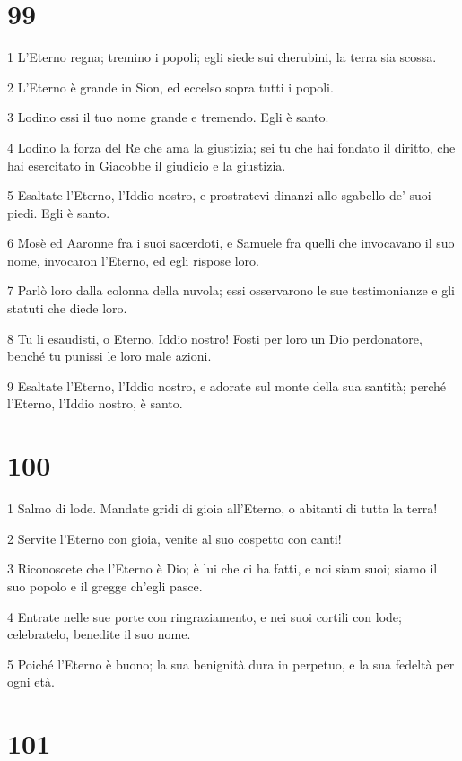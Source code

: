 \chapter{99}

\par 1 L'Eterno regna; tremino i popoli; egli siede sui cherubini, la terra sia scossa.
\par 2 L'Eterno è grande in Sion, ed eccelso sopra tutti i popoli.
\par 3 Lodino essi il tuo nome grande e tremendo. Egli è santo.
\par 4 Lodino la forza del Re che ama la giustizia; sei tu che hai fondato il diritto, che hai esercitato in Giacobbe il giudicio e la giustizia.
\par 5 Esaltate l'Eterno, l'Iddio nostro, e prostratevi dinanzi allo sgabello de' suoi piedi. Egli è santo.
\par 6 Mosè ed Aaronne fra i suoi sacerdoti, e Samuele fra quelli che invocavano il suo nome, invocaron l'Eterno, ed egli rispose loro.
\par 7 Parlò loro dalla colonna della nuvola; essi osservarono le sue testimonianze e gli statuti che diede loro.
\par 8 Tu li esaudisti, o Eterno, Iddio nostro! Fosti per loro un Dio perdonatore, benché tu punissi le loro male azioni.
\par 9 Esaltate l'Eterno, l'Iddio nostro, e adorate sul monte della sua santità; perché l'Eterno, l'Iddio nostro, è santo.

\chapter{100}

\par 1 Salmo di lode. Mandate gridi di gioia all'Eterno, o abitanti di tutta la terra!
\par 2 Servite l'Eterno con gioia, venite al suo cospetto con canti!
\par 3 Riconoscete che l'Eterno è Dio; è lui che ci ha fatti, e noi siam suoi; siamo il suo popolo e il gregge ch'egli pasce.
\par 4 Entrate nelle sue porte con ringraziamento, e nei suoi cortili con lode; celebratelo, benedite il suo nome.
\par 5 Poiché l'Eterno è buono; la sua benignità dura in perpetuo, e la sua fedeltà per ogni età.

\chapter{101}


